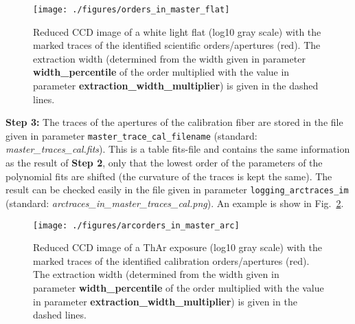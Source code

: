 \documentclass[10pt,a4paper]{article}
\begin{document}
\begin{figure} 
  \begin{center}
    \texttt{[image: ./figures/orders\_in\_master\_flat]}
  \end{center} 
  \caption{Reduced CCD image of a white light flat (log10 gray scale) with the marked traces of the identified scientific orders/apertures (red). The extraction width (determined from the width given in parameter \textbf{width\_percentile} of the order multiplied with the value in parameter \textbf{extraction\_width\_multiplier}) is given in the dashed lines.
    \label{figure_apertures_in_master_flat}}
\end{figure}


\vspace{0.5em}\noindent \textbf{Step 3:} The traces of the apertures of the calibration fiber are stored in the file given in parameter \verb|master_trace_cal_filename| (standard: \textit{master\_traces\_cal.fits}). This is a table fits-file and contains the same information as the result of \textbf{Step 2}, only that the lowest order of the parameters of the polynomial fits are shifted (the curvature of the traces is kept the same). The result can be checked easily in the file given in parameter \verb|logging_arctraces_im| (standard: \textit{arctraces\_in\_master\_traces\_cal.png}). An example is show in Fig.~\ref{figure_arcapertures_in_master_arc}.

\begin{figure} 
  \begin{center}
    \texttt{[image: ./figures/arcorders\_in\_master\_arc]}
  \end{center} 
  \caption{Reduced CCD image of a ThAr exposure (log10 gray scale) with the marked traces of the identified calibration orders/apertures (red). The extraction width (determined from the width given in parameter \textbf{width\_percentile} of the order multiplied with the value in parameter \textbf{extraction\_width\_multiplier}) is given in the dashed lines.
    \label{figure_arcapertures_in_master_arc}}
\end{figure}
\end{document}
